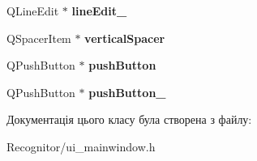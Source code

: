\begin{DoxyCompactItemize}
\item 
\hypertarget{classUi__MainWindow_a6b0c67f59741ef5626f57fc216080739}{Q\-Line\-Edit $\ast$ {\bfseries line\-Edit\-\_}}\label{classUi__MainWindow_a6b0c67f59741ef5626f57fc216080739}

\item 
\hypertarget{classUi__MainWindow_a2c53f7f2e3106a4225d5be295e1315ae}{Q\-Spacer\-Item $\ast$ {\bfseries vertical\-Spacer}}\label{classUi__MainWindow_a2c53f7f2e3106a4225d5be295e1315ae}

\item 
\hypertarget{classUi__MainWindow_aa2f2c48d459c5b5eda62071b8d750fed}{Q\-Push\-Button $\ast$ {\bfseries push\-Button}}\label{classUi__MainWindow_aa2f2c48d459c5b5eda62071b8d750fed}

\item 
\hypertarget{classUi__MainWindow_aabbfd4b71da5cff6bf630124589f6e6a}{Q\-Push\-Button $\ast$ {\bfseries push\-Button\-\_}}\label{classUi__MainWindow_aabbfd4b71da5cff6bf630124589f6e6a}

\end{DoxyCompactItemize}


Документація цього класу була створена з файлу\-:\begin{DoxyCompactItemize}
\item 
Recognitor/ui\-\_\-mainwindow.\-h\end{DoxyCompactItemize}

